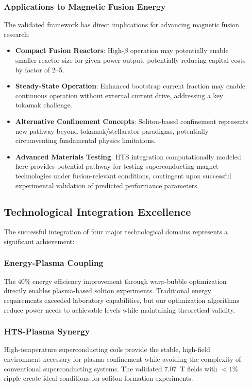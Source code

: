 \documentclass[10pt,twocolumn]{article}
\begin{document}
\subsubsection{Applications to Magnetic Fusion Energy}

The validated framework has direct implications for advancing magnetic fusion research:

\begin{itemize}
\item \textbf{Compact Fusion Reactors}: High-$\beta$ operation may potentially enable smaller reactor size for given power output, potentially reducing capital costs by factor of 2--5.
\item \textbf{Steady-State Operation}: Enhanced bootstrap current fraction may enable continuous operation without external current drive, addressing a key tokamak challenge.
\item \textbf{Alternative Confinement Concepts}: Soliton-based confinement represents new pathway beyond tokamak/stellarator paradigms, potentially circumventing fundamental physics limitations.
\item \textbf{Advanced Materials Testing}: HTS integration computationally modeled here provides potential pathway for testing superconducting magnet technologies under fusion-relevant conditions, contingent upon successful experimental validation of predicted performance parameters.
\end{itemize}

\subsection{Technological Integration Excellence}

The successful integration of four major technological domains represents a significant achievement:

\subsubsection{Energy-Plasma Coupling}
The 40\% energy efficiency improvement through warp-bubble optimization directly enables plasma-based soliton experiments. Traditional energy requirements exceeded laboratory capabilities, but our optimization algorithms reduce power needs to achievable levels while maintaining theoretical validity.

\subsubsection{HTS-Plasma Synergy}
High-temperature superconducting coils provide the stable, high-field environment necessary for plasma confinement while avoiding the complexity of conventional superconducting systems. The validated 7.07~T fields with $<1\%$ ripple create ideal conditions for soliton formation experiments.
\end{document}
